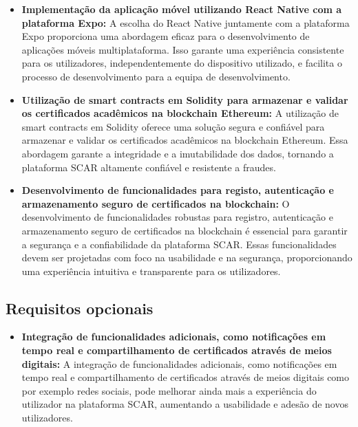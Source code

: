 \documentclass[10pt]{article}
\begin{document}
\begin{itemize}

    \item\textbf{Implementação da aplicação móvel utilizando React Native com a plataforma Expo:} A escolha do React Native
          juntamente com a plataforma Expo proporciona uma abordagem eficaz para o desenvolvimento de aplicações móveis
          multiplataforma. Isso garante uma experiência consistente para os utilizadores, independentemente do dispositivo
          utilizado, e facilita o processo de desenvolvimento para a equipa de desenvolvimento.

    \item\textbf{Utilização de smart contracts em Solidity para armazenar e validar os certificados acadêmicos na blockchain
              Ethereum:} A utilização de smart contracts em Solidity oferece uma solução segura e confiável para armazenar
          e validar os certificados acadêmicos na blockchain Ethereum. Essa abordagem garante a integridade e a
          imutabilidade dos dados, tornando a plataforma SCAR altamente confiável e resistente a fraudes.

    \item\textbf{Desenvolvimento de funcionalidades para registo, autenticação e armazenamento seguro de certificados na
              blockchain:} O desenvolvimento de funcionalidades robustas para registro, autenticação e armazenamento seguro
          de certificados na blockchain é essencial para garantir a segurança e a confiabilidade da plataforma SCAR.
          Essas funcionalidades devem ser projetadas com foco na usabilidade e na segurança, proporcionando uma
          experiência intuitiva e transparente para os utilizadores.

\end{itemize}

\subsection*{Requisitos opcionais}

\begin{itemize}

    \item\textbf{Integração de funcionalidades adicionais, como notificações em tempo real e compartilhamento de certificados
              através de meios digitais:} A integração de funcionalidades adicionais, como notificações em tempo real e
          compartilhamento de certificados através de meios digitais como por exemplo redes sociais, pode melhorar ainda mais a experiência do
          utilizador na plataforma SCAR, aumentando a usabilidade e adesão de novos utilizadores.

\end{itemize}
\end{document}
